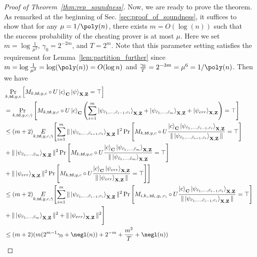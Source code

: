 \begin{proof}[Proof of Theorem~\ref{thm:rep_soundness}]
Now, we are ready to prove the theorem. 
As remarked at the beginning of Sec. \ref{sec:proof_of_soundness}, it suffices to show that for any $\mu=1/\poly(n)$, there exists $m=O(\log(n))$ such that the success probability of the cheating prover is at most $\mu$.
Here we set $m = \log \frac{1}{\mu^2}$, $\gamma_0 = 2^{-2m}$, and $T=2^{m}$. 
Note that this parameter setting satisfies the requirement for Lemma~\ref{lem:partition_further} since
$m=\log \frac{1}{\mu^2}=\log (\poly(\secpar))=O(\log \secpar)$ and
$\frac{\gamma_0}{T}=2^{-3m}=\mu^{6}=1/\poly(\secpar)$.
Then we have
\begin{align*}
    &\Pr_{k,\td,y,c}\left[M_{k,\td,y,c}\circ U\ket{c}_{\regC}\ket{\psi}_{\regX,\regZ}= \top\right] \\
     &=\Pr_{k,\td,y,c,\hat{\gamma}}\left[M_{k,\td,y,c}\circ U\ket{c}_{\regC}\left(\sum_{i=1}^{m}\ket{\psi_{\bar{c}_1,\dots,\bar{c}_{i-1},c_i}}_{\regX,\regZ} + \ket{\psi_{\bar{c}_1,\dots,\bar{c}_m}}_{\regX,\regZ}+ \ket{\psi_{err}}_{\regX,\regZ}\right) = \top\right] \\
    &\leq (m+2) \underset{k,\td,y,c,\hat{\gamma}}{E}\Biggl[\sum_{i=1}^{m} \|\ket{\psi_{\bar{c}_1,\dots,\bar{c}_{i-1},c_i}}_{\regX,\regZ}\|^2\Pr\left[M_{k,\td,y,c}\circ U\frac{\ket{c}_{\regC}\ket{\psi_{\bar{c}_1,\dots,\bar{c}_{i-1},c_i}}_{\regX,\regZ}}{\|\ket{\psi_{\bar{c}_1,\dots,\bar{c}_{i-1},c_i}}_{\regX,\regZ}\|}=\top\right]\\
   &+\|\ket{\psi_{\bar{c}_1,\dots,\bar{c}_m}}_{\regX,\regZ}\|^2\Pr\left[M_{k,\td,y,c}\circ U\frac{\ket{c}_{\regC}\ket{\psi_{\bar{c}_1,\dots,\bar{c}_m}}_{\regX,\regZ}}{\|\ket{\psi_{\bar{c}_1,\dots,\bar{c}_m}}_{\regX,\regZ}} =\top\right]\\
    &+ \|\ket{\psi_{err}}_{\regX,\regZ}\|^2\Pr\left[M_{k,\td,y,c}\circ U\frac{\ket{c}_{\regC} \ket{\psi_{err}}_{\regX,\regZ}}{\|\ket{\psi_{err}}_{\regX,\regZ}\|}=\top\right]\Biggr]\\
        &\leq (m+2) \underset{k,\td,y,c,\hat{\gamma}}{E}\Biggl[\sum_{i=1}^{m} \|\ket{\psi_{\bar{c}_1,\dots,\bar{c}_{i-1},c_i}}_{\regX,\regZ}\|^2\Pr\left[M_{i,k_i,\td_i,y_i,c_i}\circ U\frac{\ket{c}_{\regC}\ket{\psi_{\bar{c}_1,\dots,\bar{c}_{i-1},c_i}}_{\regX,\regZ}}{\|\ket{\psi_{\bar{c}_1,\dots,\bar{c}_{i-1},c_i}}_{\regX,\regZ}\|}=\top\right]\\
   &+\|\ket{\psi_{\bar{c}_1,\dots,\bar{c}_m}}_{\regX,\regZ}\|^2+ \|\ket{\psi_{err}}_{\regX,\regZ}\|^2 \Biggr]\\
    &\leq (m+2)(m(2^{m-1}\gamma_0 +\negl(n))+ 2^{-m} + \frac{m^2}{T}+\negl(\secpar)) \\

\end{align*}
\end{proof}
